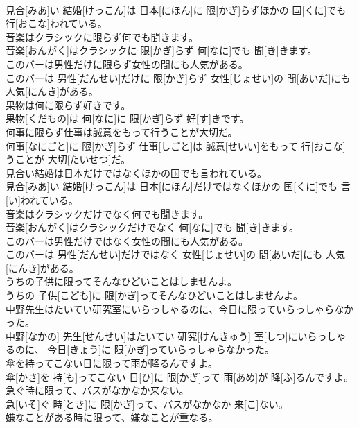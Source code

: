 \documentclass[8pt]{extreport}
\begin{document}
\begin{CJK}{UTF8}{min}
\\	見合[みあ]い 結婚[けっこん]は 日本[にほん]に 限[かぎ]らずほかの 国[くに]でも 行[おこな]われている。
\\	音楽はクラシックに限らず何でも聞きます。	
\\	音楽[おんがく]はクラシックに 限[かぎ]らず 何[なに]でも 聞[き]きます。
\\	このバーは男性だけに限らず女性の間にも人気がある。	
\\	このバーは 男性[だんせい]だけに 限[かぎ]らず 女性[じょせい]の 間[あいだ]にも 人気[にんき]がある。
\\	果物は何に限らず好きです。	
\\	果物[くだもの]は 何[なに]に 限[かぎ]らず 好[す]きです。
\\	何事に限らず仕事は誠意をもって行うことが大切だ。	
\\	何事[なにごと]に 限[かぎ]らず 仕事[しごと]は 誠意[せいい]をもって 行[おこな]うことが 大切[たいせつ]だ。
\\	見合い結婚は日本だけではなくほかの国でも言われている。	
\\	見合[みあ]い 結婚[けっこん]は 日本[にほん]だけではなくほかの 国[くに]でも 言[い]われている。
\\	音楽はクラシックだけでなく何でも聞きます。	
\\	音楽[おんがく]はクラシックだけでなく 何[なに]でも 聞[き]きます。
\\	このバーは男性だけではなく女性の間にも人気がある。	
\\	このバーは 男性[だんせい]だけではなく 女性[じょせい]の 間[あいだ]にも 人気[にんき]がある。
\\	うちの子供に限ってそんなひどいことはしませんよ。	
\\	うちの 子供[こども]に 限[かぎ]ってそんなひどいことはしませんよ。
\\	中野先生はたいてい研究室にいらっしゃるのに、今日に限っていらっしゃらなかった。	
\\	中野[なかの] 先生[せんせい]はたいてい 研究[けんきゅう] 室[しつ]にいらっしゃるのに、 今日[きょう]に 限[かぎ]っていらっしゃらなかった。
\\	傘を持ってこない日に限って雨が降るんですよ。	
\\	傘[かさ]を 持[も]ってこない 日[ひ]に 限[かぎ]って 雨[あめ]が 降[ふ]るんですよ。
\\	急ぐ時に限って、バスがなかなか来ない。	
\\	急[いそ]ぐ 時[とき]に 限[かぎ]って、バスがなかなか 来[こ]ない。
\\	嫌なことがある時に限って、嫌なことが重なる。	

\end{CJK}
\end{document}
